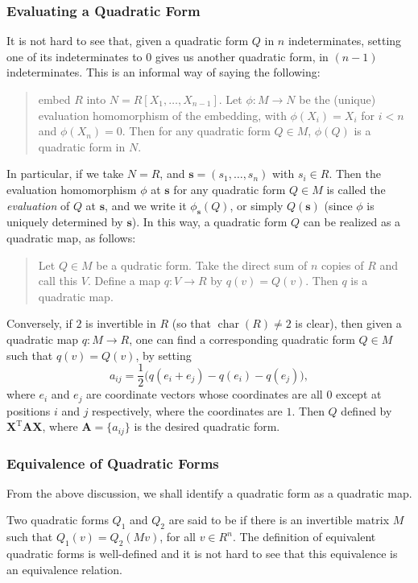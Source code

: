 \documentclass[12pt]{article}
\newcommand{\bX}{\mathbf{X}}
\newcommand{\bs}{\mathbf{s}}
\newcommand{\bA}{\mathbf{A}}
\newcommand{\0}{\mathbf{0}}
\begin{document}
\subsubsection*{Evaluating a Quadratic Form}

It is not hard to see that, given a quadratic form $Q$ in $n$ indeterminates, setting one of its indeterminates to $0$ gives us another quadratic form, in $(n-1)$ indeterminates.  This is an informal way of saying the following: 
\begin{quote}
embed $R$ into $N=R[X_1,\ldots,X_{n-1}]$.  Let $\phi:M\to N$ be the (unique) evaluation homomorphism of the embedding, with $\phi(X_i)=X_i$ for $i<n$ and $\phi(X_n)=0$.  Then for any quadratic form $Q\in M$, $\phi(Q)$ is a quadratic form in $N$.
\end{quote}

In particular, if we take $N=R$, and $\bs=(s_1,\ldots,s_n)$ with $s_i\in R$.  Then the evaluation homomorphism $\phi$ at $\bs$ for any quadratic form $Q\in M$ is called the \emph{evaluation} of $Q$ at $\bs$, and we write it $\phi_{\bs}(Q)$, or simply $Q(\bs)$ (since $\phi$ is uniquely determined by $\bs$).  In this way, a quadratic form $Q$ can be realized as a quadratic map, as follows:
\begin{quote}
Let $Q\in M$ be a qudratic form.  Take the direct sum of $n$ copies of $R$ and call this $V$.  Define a map $q:V\to R$ by $q(v)=Q(v)$.  Then $q$ is a quadratic map.
\end{quote}

Conversely, if $2$ is invertible in $R$ (so that $\operatorname{char}(R)\ne 2$ is clear), then given a quadratic map $q:M\to R$, one can find a corresponding quadratic form $Q\in M$ such that $q(v)=Q(v)$, by setting $$a_{ij}=\frac{1}{2}\big(q(e_i+e_j)-q(e_i)-q(e_j)\big),$$ where $e_i$ and $e_j$ are coordinate vectors whose coordinates are all $0$ except at positions $i$ and $j$ respectively, where the coordinates are $1$.  Then $Q$ defined by ${\bX}^{\mathrm{T}} \bA \bX$, where $\bA=\lbrace a_{ij}\rbrace$ is the desired quadratic form.

\subsubsection*{Equivalence of Quadratic Forms}

From the above discussion, we shall identify a quadratic form as a quadratic map.

Two quadratic forms $Q_1$ and $Q_2$ are said to be \emph{} if there is an invertible matrix $M$ such that $Q_1(v)=Q_2(Mv)$, for all $v\in R^n$.  The definition of equivalent quadratic forms is well-defined and it is not hard to see that this equivalence is an equivalence relation.
\end{document}
